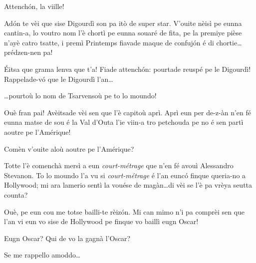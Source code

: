 \begin{drama}
\Joellespeaks{} Attench\'on, la viille!




\scene[-- Hollywood]

\Nevaouspeaks Ad\'on te vèi que sise Digourdì son pa itò de super star. V'ouite nèisì pe eunna cantin-a, lo voutro nom l'è chortì pe eunna souaré de fita, pe la premiye pièse n'ayè catro tsatte, i premì Printemps fiavade  maque de confuj\'on é di chortie\ldots prédzen-nen pa!

\Paganspeaks \'Eitsa que grama lenva que t'a! Fiade attench\'on: pourtade reuspé pe le Digourdì! Rappelade-v\'o  que le Digourdì l'an\ldots

\Ledouspeaks \ldots pourtoù lo nom de Tsarvensoù pe to lo moundo!

\Paganspeaks Ouè fran pai! Avèitsade vèi sen que l'è capitoù aprì. Aprì eun per de-z-àn n'en fé eunna matse de sou é la Val d’Outa l'ie viin-a tro petchouda pe no é sen partì aoutre pe l’Amérique!

\Nevaousaspeaks Comèn v'ouite aloù aoutre pe l’Amérique?

\Paganspeaks  Totte l'è comenchà mersì a eun \textit{court-métrage} que n'en fé avouì Alessandro Stevanon. To lo moundo l'a vu si \textit{court-métrage} é l'an euncó finque queria-no a Hollywood; mi ara lamerio sentì la vouése de magàn\ldots di vèi se l'è pa vrèya seutta counta?

\Maganspeaks Ouè, pe eun cou me totse bailli-te rèiz\'on. Mi can mimo n'i pa comprèi sen que l'an vi eun vo sise de Hollywood pe finque vo baillì eugn Oscar!

\Nevaousaspeaks Eugn Oscar? Qui de vo la gagnà l’Oscar?

\Paganspeaks Se me rappello amoddo\ldots






\end{drama}
